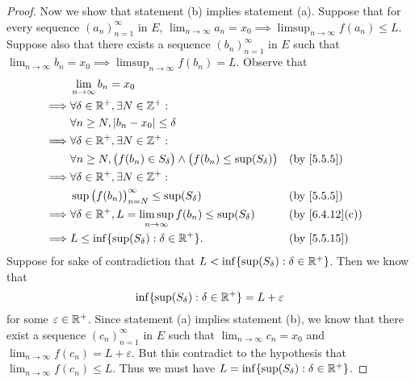 \begin{proof}
  Now we show that statement (b) implies statement (a).
  Suppose that for every sequence \((a_n)_{n = 1}^\infty\) in \(E\), \(\lim_{n \to \infty} a_n = x_0 \implies \limsup_{n \to \infty} f(a_n) \leq L\).
  Suppose also that there exists a sequence \((b_n)_{n = 1}^\infty\) in \(E\) such that \(\lim_{n \to \infty} b_n = x_0 \implies \limsup_{n \to \infty} f(b_n) = L\).
  Observe that
  \begin{align*}
             & \lim_{n \to \infty} b_n = x_0                                                                                                    \\
    \implies & \forall \delta \in \R^+, \exists N \in \Z^+ :                                                                                    \\
             & \forall n \geq N, \abs{b_n - x_0} \leq \delta                                                                                    \\
    \implies & \forall \delta \in \R^+, \exists N \in \Z^+ :                                                                                    \\
             & \forall n \geq N, \big(f(b_n) \in S_{\delta}\big) \land \big(f(b_n) \leq \sup(S_{\delta})\big) &  & \by{5.5.5}                   \\
    \implies & \forall \delta \in \R^+, \exists N \in \Z^+ :                                                                                    \\
             & \sup\big(f(b_n)\big)_{n = N}^\infty \leq \sup(S_{\delta})                                      &  & \by{5.5.5}                   \\
    \implies & \forall \delta \in \R^+, L = \limsup_{n \to \infty} f(b_n) \leq \sup(S_{\delta})               &  & \text{(by \cref{6.4.12}(c))} \\
    \implies & L \leq \inf\{\sup(S_{\delta}) : \delta \in \R^+\}.                                             &  & \by{5.5.15}
  \end{align*}
  Suppose for sake of contradiction that \(L < \inf\{\sup(S_\delta) : \delta \in \mathbb{R}^+\}\).
  Then we know that
  \[
    \inf\{\sup(S_\delta) : \delta \in \mathbb{R}^+\} = L + \varepsilon
  \]
  for some \(\varepsilon \in \mathbb{R}^+\).
  Since statement (a) implies statement (b), we know that there exist a sequence \((c_n)_{n = 1}^\infty\) in \(E\) such that \(\lim_{n \to \infty} c_n = x_0\) and \(\lim_{n \to \infty} f(c_n) = L + \varepsilon\).
  But this contradict to the hypothesis that \(\lim_{n \to \infty} f(c_n) \leq L\).
  Thus we must have \(L = \inf\{\sup(S_{\delta}) : \delta \in \mathbb{R}^+\}\).
\end{proof}

